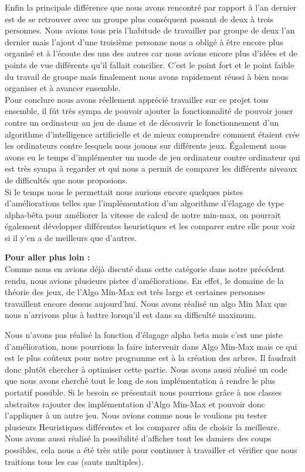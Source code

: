 \documentclass[12,french]{report}
\begin{document}
Enfin la principale différence que nous avons rencontré par rapport à l'an dernier est de se retrouver avec un groupe plus conséquent passant de deux à trois personnes. Nous avions tous pris l'habitude de travailler par groupe de deux l'an dernier mais l'ajout d'une troisième personne nous a obligé à être encore plus organisé et à l'écoute des uns des autres car nous avions encore plus d'idées et de points de vue différents qu'il fallait concilier. C'est le point fort et le point faible du travail de groupe mais finalement nous avons rapidement réussi à bien nous organiser et à avancer ensemble.\\

Pour conclure nous avons réellement apprécié travailler sur ce projet tous ensemble, il fût très sympa de pouvoir ajouter la fonctionnalité de pouvoir jouer contre un ordinateur au jeu de dame et de découvrir le fonctionnement d'un algorithme d'intelligence artificielle et de mieux comprendre comment étaient crée les ordinateurs contre lesquels nous jouons sur différents jeux. Également nous avons eu le temps d'implémenter un mode de jeu ordinateur contre ordinateur qui est très sympa à regarder et qui nous a permit de comparer les différents niveaux de difficultés que nous proposions.\\
Si le temps nous le permettait nous aurions encore quelques pistes d'améliorations telles que l'implémentation d'un algorithme d'élagage de type alpha-bêta pour améliorer la vitesse de calcul de notre min-max, on pourrait également développer différentes heuristiques et les comparer entre elle pour voir si il y'en a de meilleurs que d'autres.


\textbf{Pour aller plus loin :} \\

Comme nous en avions déjà discuté dans cette catégorie dans notre précédent rendu, nous avions plusieurs pistes d'améliorations. En effet, le domaine de la théorie des jeux, de l'Algo Min-Max est très large et certaines personnes travaillent encore dessus aujourd'hui. Nous avons réalisé un algo Min Max que nous n'arrivons plus à battre lorsqu'il est dans sa difficulté maximum. 

Nous n'avons pas réalisé la fonction d'élagage alpha beta mais c'est une piste d'amélioration, nous pourrions la faire intervenir dans Algo Min-Max mais ce qui est le plus coûteux pour notre programme est à la création des arbres. Il faudrait donc plutôt chercher à optimiser cette partie. 
Nous avons aussi réalisé un code que nous avons cherché tout le long de son implémentation à rendre le plus portatif possible. Si le besoin se présentait nous pourrions grâce à nos classes abstraites rajouter des implémentation d'Algo Min-Max et pouvoir donc l'appliquer à un autre jeu.
Nous avions comme nous le voulions pu tester plusieurs Heuristiques différentes et les comparer afin de choisir la meilleure.
Nous avons aussi réalisé la possibilité d'afficher tout les damiers des coups possibles, cela nous a été très utile pour continuer à travailler et vérifier que nous traitions tous les cas (sauts multiples).
\end{document}
